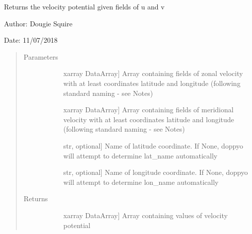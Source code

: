 \documentclass[letterpaper,10pt,english]{sphinxmanual}
\begin{document}
\begin{fulllineitems}
\label{\detokenize{diagnostic_doc:diagnostic.velocity_potential}}
Returns the velocity potential given fields of u and v

\begin{DUlineblock}{0em}
\item[] Author: Dougie Squire
\item[] Date: 11/07/2018
\end{DUlineblock}
\begin{quote}\begin{description}
\item[{Parameters}] \leavevmode\begin{description}
\item[{}] \leavevmode{[}xarray DataArray{]}
Array containing fields of zonal velocity with at least coordinates latitude and longitude                     (following standard naming - see Notes)

\item[{}] \leavevmode{[}xarray DataArray{]}
Array containing fields of meridional velocity with at least coordinates latitude and                     longitude (following standard naming - see Notes)

\item[{}] \leavevmode{[}str, optional{]}
Name of latitude coordinate. If None, doppyo will attempt to determine lat\_name                     automatically

\item[{}] \leavevmode{[}str, optional{]}
Name of longitude coordinate. If None, doppyo will attempt to determine lon\_name                     automatically

\end{description}

\item[{Returns}] \leavevmode\begin{description}
\item[{}] \leavevmode{[}xarray DataArray{]}
Array containing values of velocity potential

\end{description}

\end{description}\end{quote}

\end{fulllineitems}
\end{document}
